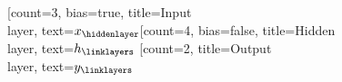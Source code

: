 \begin{neuralnetwork}[height=4]
  \newcommand{\x}[2]{$x_#2$}
  \newcommand{\y}[2]{$y_#2$}
  \newcommand{\hfirst}[2]{\small $h_#2$}
  [count=3, bias=true, title=Input\\layer, text=\x]
  \hiddenlayer[count=4, bias=false, title=Hidden\\layer, text=\hfirst] \linklayers
  \outputlayer[count=2, title=Output\\layer, text=\y] \linklayers
\end{neuralnetwork}
